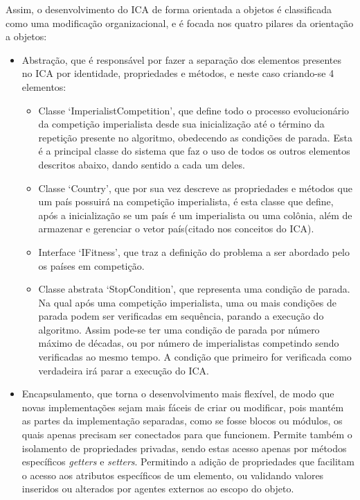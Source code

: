 Assim, o desenvolvimento do ICA de forma orientada a objetos é classificada como uma modificação organizacional, e é focada nos quatro pilares da orientação a objetos:
\begin{itemize}
\item Abstração, que é responsável por fazer a separação dos elementos presentes no ICA por identidade, propriedades e métodos, e neste caso criando-se 4 elementos:

\begin{itemize}
\item Classe ‘ImperialistCompetition’, que define todo o processo evolucionário da competição imperialista desde sua inicialização até o término da repetição presente no algoritmo, obedecendo as condições de parada. Esta é a principal classe do sistema que faz o uso de todos os outros elementos descritos abaixo, dando sentido a cada um deles.
\item Classe ‘Country’, que por sua vez descreve as propriedades e métodos que um país possuirá na competição imperialista, é esta classe que define, após a inicialização se um país é um imperialista ou uma colônia, além de armazenar e gerenciar o vetor país(citado nos conceitos do ICA).
\item Interface ‘IFitness’, que traz a definição do problema a ser abordado pelo os países em competição.
\item  Classe abstrata ‘StopCondition’, que representa uma condição de parada. Na qual após uma competição imperialista, uma ou mais condições de parada podem ser verificadas em sequência, parando a execução do algoritmo. Assim pode-se ter uma condição de parada por número máximo de décadas, ou por número de imperialistas competindo sendo verificadas ao mesmo tempo. A condição que primeiro for verificada como verdadeira irá parar a execução do ICA.
\end{itemize}
 
\item Encapsulamento, que torna o desenvolvimento mais flexível, de modo que novas implementações sejam mais fáceis de criar ou modificar, pois mantém as partes da implementação separadas, como se fosse blocos ou módulos, os quais apenas precisam ser conectados para que funcionem. 
Permite também o isolamento de propriedades privadas, sendo estas acesso apenas por métodos específicos \emph{getters} e \emph{setters}. Permitindo a adição de propriedades que facilitam o acesso aos atributos específicos de um elemento, ou validando valores inseridos ou alterados por agentes externos ao escopo do objeto.


\end{itemize}
